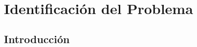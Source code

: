 \documentclass{report}
\makeatletter
\let\thedate\@date
\makeatother
\begin{document}
\begin{titlepage}
	{\large \thedate}\\[2 cm]
 
	\vfill
	
\end{titlepage}


\tableofcontents
\pagebreak

\chapter{Identificación del Problema}
    
    \section{Introducción}
\end{document}
